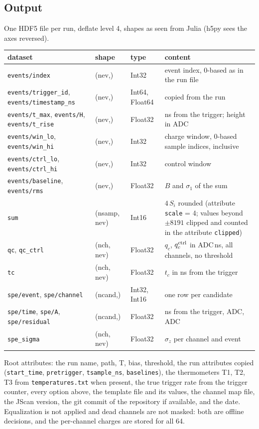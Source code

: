 \documentclass[11pt]{article}
\newcommand{\code}[1]{\texttt{#1}}
\begin{document}
\subsection{Output}

One HDF5 file per run, deflate level 4, shapes as seen from Julia (h5py
sees the axes reversed).

\begin{center}
\begin{tabular}{l l l p{62mm}}
\toprule
dataset & shape & type & content \\
\midrule
\code{events/index} & (nev,) & Int32 & event index, 0-based as in the run file \\
\code{events/trigger\_id}, \code{events/timestamp\_ns} & (nev,) & Int64, Float64 & copied from the run \\
\code{events/t\_max}, \code{events/H}, \code{events/t\_rise} & (nev,) & Float32 & ns from the trigger; height in ADC \\
\code{events/win\_lo}, \code{events/win\_hi} & (nev,) & Int32 & charge window, 0-based sample indices, inclusive \\
\code{events/ctrl\_lo}, \code{events/ctrl\_hi} & (nev,) & Int32 & control window \\
\code{events/baseline}, \code{events/rms} & (nev,) & Float32 & $B$ and $\sigma_1$ of the sum \\
\code{sum} & (nsamp, nev) & Int16 & $4\,S_i$ rounded (attribute \code{scale} = 4; values beyond $\pm 8191$ clipped and counted in the attribute \code{clipped}) \\
\code{qc}, \code{qc\_ctrl} & (nch, nev) & Float32 & $q_c$, $q_c^{\rm ctrl}$ in ADC\,ns, all channels, no threshold \\
\code{tc} & (nch, nev) & Float32 & $t_c$ in ns from the trigger \\
\code{spe/event}, \code{spe/channel} & (ncand,) & Int32, Int16 & one row per candidate \\
\code{spe/time}, \code{spe/A}, \code{spe/residual} & (ncand,) & Float32 & ns from the trigger, ADC, ADC \\
\code{spe\_sigma} & (nch, nev) & Float32 & $\sigma_z$ per channel and event \\
\bottomrule
\end{tabular}
\end{center}

Root attributes: the run name, path, T, bias, threshold, the run
attributes copied (\code{start\_time}, \code{pretrigger}, \code{tsample\_ns},
\code{baselines}), the thermometers T1, T2, T3 from \code{temperatures.txt}
when present, the true trigger rate from the trigger counter, every option
above, the template file and its values, the channel map file, the JScan
version, the git commit of the repository if available, and the date.
Equalization is not applied and dead channels are not masked: both are
offline decisions, and the per-channel charges are stored for all 64.
\end{document}

